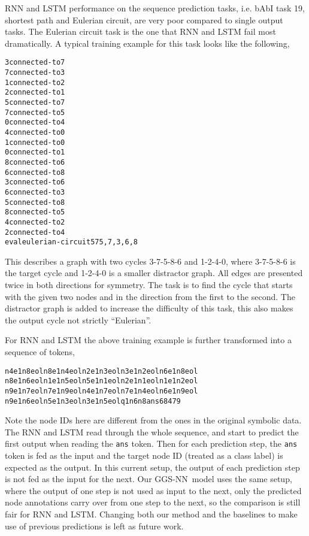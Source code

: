 \documentclass{article} \usepackage{iclr2016_conference,times}
\newcommand{\OurMethodShort}{GGS-NN}
\begin{document}
RNN and LSTM performance on the sequence prediction tasks, i.e. bAbI task 19,
shortest path and Eulerian circuit, are very poor compared to single output
tasks.  The Eulerian circuit task is the one that RNN and LSTM fail most
dramatically.  A typical training example for this task looks like the
following,
\begin{framed}
\begin{alltt}
3 connected-to 7
7 connected-to 3
1 connected-to 2
2 connected-to 1
5 connected-to 7
7 connected-to 5
0 connected-to 4
4 connected-to 0
1 connected-to 0
0 connected-to 1
8 connected-to 6
6 connected-to 8
3 connected-to 6
6 connected-to 3
5 connected-to 8
8 connected-to 5
4 connected-to 2
2 connected-to 4
eval eulerian-circuit 5 7       5,7,3,6,8
\end{alltt}
\end{framed}
This describes a graph with two cycles 3-7-5-8-6 and 1-2-4-0, where 3-7-5-8-6
is the target cycle and 1-2-4-0 is a smaller distractor graph.  All edges are
presented twice in both directions for symmetry. The task is to find the cycle
that starts with the given two nodes and in the direction from the first to
the second.  The distractor graph is added to increase the difficulty of this
task, this also makes the output cycle not strictly ``Eulerian''.

For RNN and LSTM the above training example is further transformed into a
sequence of tokens,
\begin{framed}
\begin{alltt}
n4 e1 n8 eol n8 e1 n4 eol n2 e1 n3 eol n3 e1 n2 eol n6 e1 n8 eol
n8 e1 n6 eol n1 e1 n5 eol n5 e1 n1 eol n2 e1 n1 eol n1 e1 n2 eol
n9 e1 n7 eol n7 e1 n9 eol n4 e1 n7 eol n7 e1 n4 eol n6 e1 n9 eol
n9 e1 n6 eol n5 e1 n3 eol n3 e1 n5 eol q1 n6 n8 ans 6 8 4 7 9
\end{alltt}
\end{framed}
Note the node IDs here are different from the ones in the original symbolic
data. The RNN and LSTM read through the whole sequence, and start to predict
the first output when reading the \texttt{ans} token.  Then for each
prediction step, the \texttt{ans} token is fed as the input and the target
node ID (treated as a class label) is expected as the output.  In this
current setup, the output of each prediction step is not fed as the input for
the next. Our \OurMethodShort~model uses the same setup, where the output
of one step is not used as input to the next, only the predicted node
annotations  carry over from one step to the next, so the
comparison is still fair for RNN and LSTM.  Changing both our method and the
baselines to make use of previous predictions is left as future work.
\end{document}

